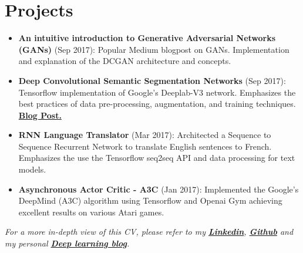 \documentclass[9pt, a4paper, oneside, final]{scrartcl} %
\begin{document}

\section{Projects}

\begin{itemize}\itemsep2pt \parskip1.5pt 

\item \textbf{An intuitive introduction to Generative Adversarial Networks (GANs)} (Sep 2017): Popular Medium blogpost on GANs. Implementation and explanation of the DCGAN architecture and concepts.

\item \textbf{Deep Convolutional Semantic Segmentation Networks} (Sep 2017): Tensorflow implementation of Google's Deeplab-V3 network. Emphasizes the best practices of data pre-processing, augmentation, and training techniques. \textbf{\href{https://medium.freecodecamp.org/diving-into-deep-convolutional-semantic-segmentation-networks-and-deeplab-v3-4f094fa387df}{Blog Post.}}

\item \textbf{RNN Language Translator} (Mar 2017): Architected a Sequence to Sequence Recurrent Network to translate English sentences to French. Emphasizes the use the Tensorflow seq2seq API and data processing for text models.

\item \textbf{Asynchronous Actor Critic - A3C} (Jan 2017): Implemented the Google's DeepMind (A3C) algorithm using Tensorflow and Openai Gym achieving excellent results on various Atari games.

\end{itemize}

\textit{For a more in-depth view of this CV, please refer to my \textbf{\href{https://www.linkedin.com/in/thalles-silva-32ab08a3/}{Linkedin}}, \textbf{\href{https://github.com/sthalles}{Github}} and my personal \textbf{\href{https://sthalles.github.io/}{Deep learning blog}}.}
\end{document}
